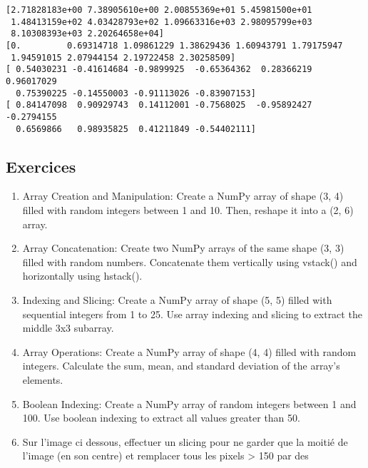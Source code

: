 \documentclass[11pt]{article}
\begin{document}
    \begin{Verbatim}[commandchars=\\\{\}]
[2.71828183e+00 7.38905610e+00 2.00855369e+01 5.45981500e+01
 1.48413159e+02 4.03428793e+02 1.09663316e+03 2.98095799e+03
 8.10308393e+03 2.20264658e+04]
[0.         0.69314718 1.09861229 1.38629436 1.60943791 1.79175947
 1.94591015 2.07944154 2.19722458 2.30258509]
[ 0.54030231 -0.41614684 -0.9899925  -0.65364362  0.28366219  0.96017029
  0.75390225 -0.14550003 -0.91113026 -0.83907153]
[ 0.84147098  0.90929743  0.14112001 -0.7568025  -0.95892427 -0.2794155
  0.6569866   0.98935825  0.41211849 -0.54402111]
    \end{Verbatim}

    \hypertarget{exercices}{%
\subsection{Exercices}\label{exercices}}

\begin{enumerate}
\def\labelenumi{\arabic{enumi}.}
\item
  Array Creation and Manipulation: Create a NumPy array of shape (3, 4)
  filled with random integers between 1 and 10. Then, reshape it into a
  (2, 6) array.
\item
  Array Concatenation: Create two NumPy arrays of the same shape (3, 3)
  filled with random numbers. Concatenate them vertically using vstack()
  and horizontally using hstack().
\item
  Indexing and Slicing: Create a NumPy array of shape (5, 5) filled with
  sequential integers from 1 to 25. Use array indexing and slicing to
  extract the middle 3x3 subarray.
\item
  Array Operations: Create a NumPy array of shape (4, 4) filled with
  random integers. Calculate the sum, mean, and standard deviation of
  the array's elements.
\item
  Boolean Indexing: Create a NumPy array of random integers between 1
  and 100. Use boolean indexing to extract all values greater than 50.
\item
  Sur l'image ci dessous, effectuer un slicing pour ne garder que la
  moitié de l'image (en son centre) et remplacer tous les pixels
  \textgreater{} 150 par des
\end{enumerate}
\end{document}
